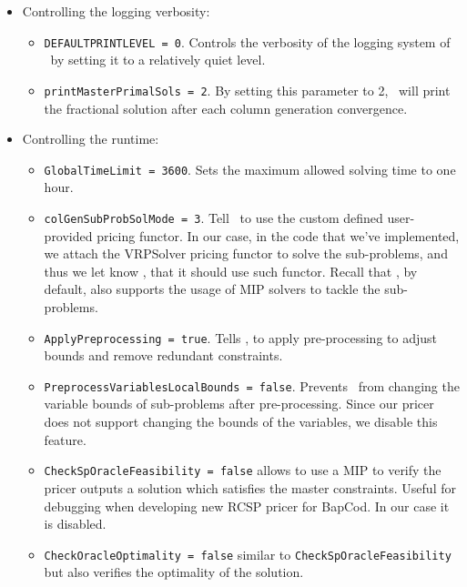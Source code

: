 \begin{itemize}
	\item Controlling the logging verbosity:
	      \begin{itemize}
		      \item \texttt{DEFAULTPRINTLEVEL = 0}.
		            Controls the verbosity of the logging system of \bapcod\ by setting it to a relatively quiet level.
		      \item \texttt{printMasterPrimalSols = 2}.
		            By setting this parameter to 2, \bapcod\ will print the fractional solution after each column generation convergence.
	      \end{itemize}

	\item Controlling the runtime:
	      \begin{itemize}
		      \item \texttt{GlobalTimeLimit = 3600}. Sets the maximum allowed solving time to one hour.
		      \item \texttt{colGenSubProbSolMode = 3}. Tell \bapcod\ to use the custom defined user-provided pricing functor.
		            In our case, in the code that we've implemented, we attach the VRPSolver pricing functor to solve the sub-problems,
		            and thus we let know \bapcod, that it should use such functor.
		            Recall that \bapcod, by default, also supports the usage of MIP solvers to tackle the sub-problems.
		      \item \texttt{ApplyPreprocessing = true}. Tells \bapcod, to apply pre-processing to adjust bounds and remove redundant constraints.
		      \item \texttt{PreprocessVariablesLocalBounds = false}.
		            Prevents \bapcod\ from changing the variable bounds of sub-problems after pre-processing.
		            Since our pricer does not support changing the bounds of the variables,
		            we disable this feature.
		      \item \texttt{CheckSpOracleFeasibility = false} allows to use a MIP to verify the pricer outputs a solution which satisfies the master constraints. Useful for debugging when developing new RCSP pricer for BapCod.
		            In our case it is disabled.
		      \item \texttt{CheckOracleOptimality = false} similar to \texttt{CheckSpOracleFeasibility} but also verifies the optimality of the solution.
	      \end{itemize}


\end{itemize}
